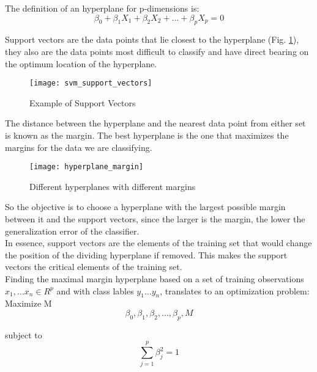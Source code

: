 The definition of an hyperplane for p-dimensions is:
\begin{equation}
\beta_0 + \beta_1 X_1 + \beta_2 X_2 + \dots + \beta_p X_p = 0
\end{equation}

Support vectors are the data points that lie closest to the hyperplane (Fig. \ref{fig:suppvec}), they also are the data points most difficult to classify and have direct bearing on the optimum location of the hyperplane.\\
\begin{figure}[h]
	\centering
	\texttt{[image: svm\_support\_vectors]}
	\caption{Example of Support Vectors}
	\label{fig:suppvec}
\end{figure}

The distance between the hyperplane and the nearest data point from either set is known as the margin. The best hyperplane is the one that maximizes the margins for the data we are classifying.\\
\begin{figure}[H]
	\centering
	\texttt{[image: hyperplane\_margin]}
	\caption{Different hyperplanes with different margins \cite{svm_monkeylearn}}
\end{figure}

So the objective is to choose a hyperplane with the largest possible margin between it and the support vectors, since the larger is the margin, the lower the generalization error of the classifier.\\

In essence, support vectors are the elements of the training set that would change the position of the dividing hyperplane if removed. This makes the support vectors the critical elements of the training set.\\

Finding the maximal margin hyperplane based on a set of training observations $x_1, \dots x_n \in R^p$ and with class lables $y_1 \dots y_n$, translates to an optimization problem:\\

Maximize M
\begin{equation} \label{eq:svm1}
\beta_0, \beta_1, \beta_2, \dots, \beta_p, M
\end{equation}

subject to
\begin{equation} \label{eq:svm2}
\sum_{j=1}^{p}\beta^2_j = 1
\end{equation}


